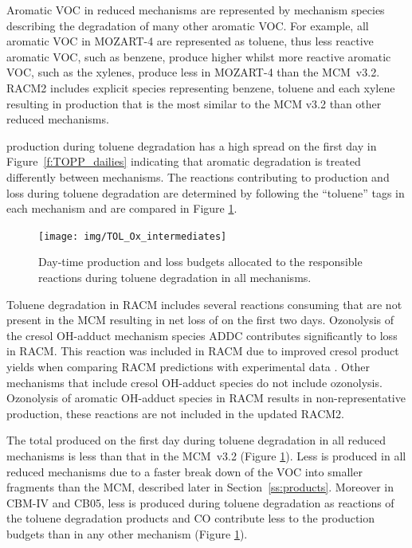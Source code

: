 Aromatic VOC in reduced mechanisms are represented by mechanism species describing the degradation of many other aromatic VOC.
For example, all aromatic VOC in MOZART-4 are represented as toluene, thus less reactive aromatic VOC, such as benzene, produce higher  whilst more reactive aromatic VOC, such as the xylenes, produce less  in MOZART-4 than the \mbox{MCM v3.2}.
RACM2 includes explicit species representing benzene, toluene and each xylene resulting in  production that is the most similar to the MCM v3.2 than other reduced mechanisms.

 production during toluene degradation has a high spread on the first day in \mbox{Figure \ref{f:TOPP_dailies}} indicating that aromatic degradation is treated differently between mechanisms.
The reactions contributing to  production and loss during toluene degradation are determined by following the ``toluene'' tags in each mechanism and are compared in Figure \ref{f:toluene_Ox}.

%
\begin{figure}
    \centering
    \texttt{[image: img/TOL\_Ox\_intermediates]}
    \vspace{0mm}
    \caption{Day-time  production and loss budgets allocated to the responsible reactions during toluene degradation in all mechanisms.}
    \vspace{-4mm}
    \label{f:toluene_Ox}
\end{figure}
%
Toluene degradation in RACM includes several reactions consuming  that are not present in the MCM resulting in net loss of  on the first two days.
Ozonolysis of the cresol OH-adduct mechanism species ADDC contributes significantly to  loss in RACM.
This reaction was included in RACM due to improved cresol product yields when comparing RACM predictions with experimental data \citep{Stockwell:1997}. 
Other mechanisms that include cresol OH-adduct species do not include ozonolysis.
Ozonolysis of aromatic OH-adduct species in RACM results in non-representative  production, these reactions are not included in the updated RACM2.

The total  produced on the first day during toluene degradation in all reduced mechanisms is less than that in the \mbox{MCM v3.2} (Figure \ref{f:toluene_Ox}).
Less  is produced in all reduced mechanisms due to a faster break down of the VOC into smaller fragments than the MCM, described later in \mbox{Section \ref{ss:products}}.
Moreover in CBM-IV and CB05, less  is produced during toluene degradation as reactions of the toluene degradation products  and CO contribute less to the  production budgets than in any other mechanism (Figure \ref{f:toluene_Ox}).


